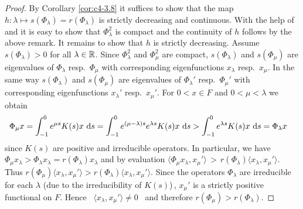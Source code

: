 \begin{proof}
By Corollary \ref{cor:c4-3.8} it suffices to show that the map $h \colon \lambda \mapsto s(\Phi_{\lambda}) = r(\Phi_{\lambda})$ is strictly decreasing and continuous.
With the help of \citet[Theorem III.11.4]{schaefer:1966} and \citet[Theorem II.9.9]{schaefer:1974} it is easy to show that $\Phi_{\lambda}^{2}$ is compact and the continuity of $h$ follows by the above remark.
It remains to show that $h$ is strictly decreasing.
Assume $s(\Phi_{\lambda}) > 0$ for all $\lambda \in \mathbb{R}$.
Since $\Phi_{\lambda}^{2}$ and $\Phi_{\mu}^{2}$ are compact, 
$s(\Phi_{\lambda})$ and $s(\Phi_{\mu})$ are eigenvalues of $\Phi_{\lambda}$ resp.\ $\Phi_{\mu}$ with corresponding eigenfunctions $x_{\lambda}$ resp.\ $x_{\mu}$.
In the same way $s(\Phi_{\lambda})$ and $s(\Phi_{\mu})$ are eigenvalues of $\Phi_{\lambda}'$ resp.\ $\Phi_{\mu}'$ with corresponding eigenfunctions $x_{\lambda}'$ resp.\ $x_{\mu}'$.
For $0 < x \in F$ and $0 < \mu < \lambda$ we obtain
\begin{align*}
\Phi_{\mu}x &= \int_{-1}^{0} e^{\mu s}K(s)x \, \mathop{}\!\mathrm{d}{s} = \int_{-1}^{0} e^{(\mu-\lambda) s}e^{\lambda s}K(s)x \, \mathop{}\!\mathrm{d}{s} > \int_{-1}^{0} e^{\lambda s}K(s)x \, \mathop{}\!\mathrm{d}{s} = \Phi_{\lambda}x
\end{align*}
since $K(s)$ are positive and irreducible operators.
In particular, we have 
\linebreak[4] 
$\Phi_{\mu}x_{\lambda} > \Phi_{\lambda}x_{\lambda} = r(\Phi_{\lambda})x_{\lambda}$ and by evaluation $\langle\Phi_{\mu}x_{\lambda},x_{\mu}'\rangle \,>\, r(\Phi_{\lambda})\langle x_{\lambda},x_{\mu}'\rangle$.
Thus $r(\Phi_{\mu})\langle x_{\lambda},x_{\mu}'\rangle > r(\Phi_{\lambda})\langle x_{\lambda},x_{\mu}'\rangle$.
Since the operators $\Phi_{\lambda}$ are irreducible for each $\lambda$ (due to the irreducibility of $K(s)$)\,, $x_{\mu}'$ is a strictly positive functional on $F$.
Hence \ $\langle x_{\lambda},x_{\mu}'\rangle \neq 0$ \ and therefore
\linebreak[3]
$r(\Phi_{\mu}) > r(\Phi_{\lambda})$.
\end{proof}

